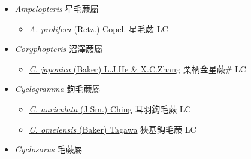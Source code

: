 
  \begin{itemize}
 \item[] \textit{Ampelopteris} 星毛蕨屬
                    
  \begin{itemize}
        \item[] \href{http://www.theplantlist.org/tpl1.1/search?q=Ampelopteris+prolifera}{\textit{A. prolifera} (Retz.) Copel.}   星毛蕨 LC
  \end{itemize}
 \item[] \textit{Coryphopteris} 沼澤蕨屬
                    
  \begin{itemize}
        \item[] \href{http://www.theplantlist.org/tpl1.1/search?q=Coryphopteris+japonica}{\textit{C. japonica} (Baker) L.J.He \& X.C.Zhang}     栗柄金星蕨\# LC
  \end{itemize}
 \item[] \textit{Cyclogramma} 鉤毛蕨屬
                    
  \begin{itemize}
        \item[] \href{http://www.theplantlist.org/tpl1.1/search?q=Cyclogramma+auriculata}{\textit{C. auriculata} (J.Sm.) Ching}     耳羽鈎毛蕨 LC
        \item[] \href{http://www.theplantlist.org/tpl1.1/search?q=Cyclogramma+omeiensis}{\textit{C. omeiensis} (Baker) Tagawa}     狹基鈎毛蕨 LC
  \end{itemize}
 \item[] \textit{Cyclosorus} 毛蕨屬
                    

\end{itemize}
